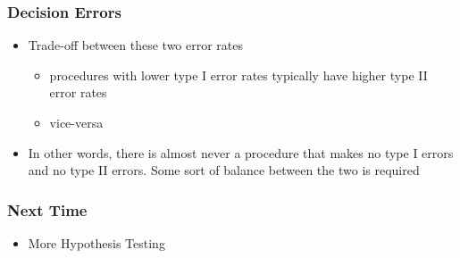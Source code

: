 \documentclass[handout]{beamer}
\begin{document}
\begin{frame}
\frametitle{Decision Errors}
\begin{itemize}
\item Trade-off between these two error rates
\begin{itemize}
\item procedures with lower type I error rates typically have higher type II error rates
\item vice-versa
\end{itemize}
\pause \item In other words, there is almost never a procedure that makes no type I errors and no type II errors.  Some sort of balance between the two is required
\end{itemize}
\end{frame}


\begin{frame}[fragile]
\frametitle{Next Time}

\begin{itemize}
\item More Hypothesis Testing
\end{itemize}

\end{frame}
\end{document}
